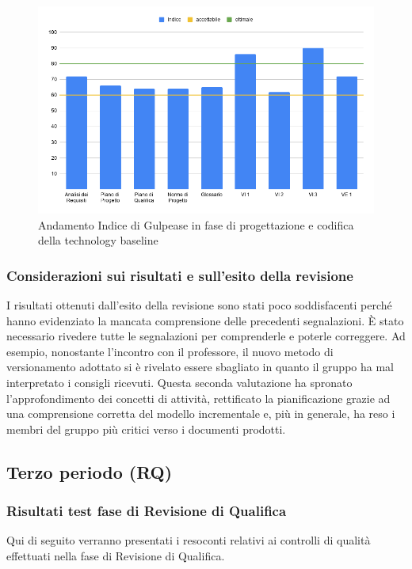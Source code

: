 \documentclass[../piano_di_qualifica.tex]{subfiles}
\begin{document}
\begin{figure}[H]
	\centering
	\includegraphics[width=14cm]{img/media_gul_RP.png}
	\caption{Andamento Indice di Gulpease in fase di progettazione e codifica della technology baseline}
\end{figure}

\subsubsection{Considerazioni sui risultati e sull’esito della revisione}
I risultati ottenuti dall'esito della revisione sono stati poco soddisfacenti perché hanno evidenziato la mancata comprensione delle precedenti segnalazioni. È stato necessario rivedere tutte le segnalazioni per comprenderle e poterle correggere. Ad esempio, nonostante l'incontro con il professore, il nuovo metodo di versionamento adottato si è rivelato essere sbagliato in quanto il gruppo ha mal interpretato i consigli ricevuti.
Questa seconda valutazione ha spronato l'approfondimento dei concetti di attività, rettificato la pianificazione grazie ad una comprensione corretta del modello incrementale e, più in generale, ha reso i membri del gruppo più critici verso i documenti prodotti.

\subsection{Terzo periodo (RQ)}
\label{sub:periodo-RQ}
\subsubsection{Risultati test fase di Revisione di Qualifica}
Qui di seguito verranno presentati i resoconti relativi ai controlli di qualità effettuati nella fase di Revisione di Qualifica.
\end{document}
